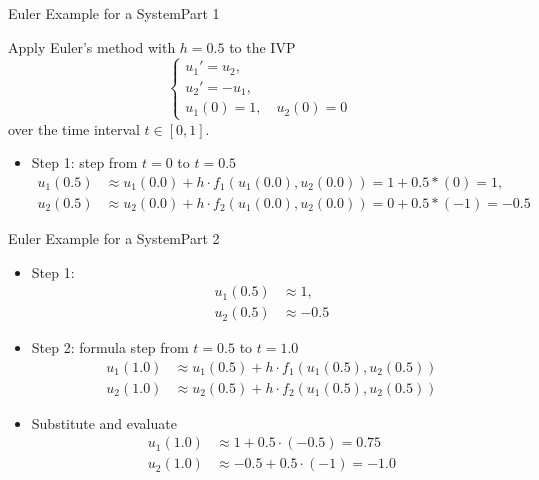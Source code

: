 \documentclass[10pt]{beamer}
\begin{document}
\begin{frame}{Euler Example for a System}{Part 1}
\begin{example}
Apply Euler's method with $h = 0.5$ to the IVP
\[
\begin{cases}
u_1' = u_2, \\
u_2' = -u_1, \\
u_1(0) = 1, \quad u_2(0) = 0
\end{cases}
\]
over the time interval $t \in [0, 1]$.
\end{example}

\begin{itemize}
    \item Step 1: step from $t=0$ to $t=0.5$
    \begin{align*}
    u_1(0.5) &\approx u_1(0.0) + h \cdot f_1( u_1(0.0), u_2(0.0)) = 1 + 0.5*(0) = 1,\\
    u_2(0.5) &\approx u_2(0.0) + h \cdot f_2(u_1(0.0),u_2(0.0)) = 0 + 0.5*(-1) = -0.5
    \end{align*}

\end{itemize}
\end{frame}



\begin{frame}{Euler Example for a System}{Part 2}


\begin{itemize}
    \item Step 1: 
    \begin{align*}
    u_1(0.5) &\approx 1,\\
    u_2(0.5) &\approx  -0.5
    \end{align*}
    
    \item Step 2: formula step from $t=0.5$ to $t=1.0$
    \begin{align*}
    u_1(1.0) &\approx u_1(0.5) + h \cdot f_1( u_1(0.5), u_2(0.5))\\
    u_2(1.0) &\approx u_2(0.5) + h \cdot f_2(u_1(0.5),u_2(0.5)) 
    \end{align*}
    \item Substitute and evaluate
    \begin{align*}
    u_1(1.0) &\approx 1 + 0.5 \cdot (-0.5) = 0.75 \\
    u_2(1.0) &\approx -0.5 + 0.5\cdot(-1) = -1.0
    \end{align*}
\end{itemize}
\end{frame}
\end{document}
